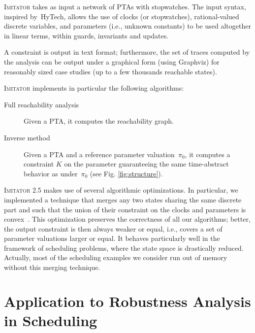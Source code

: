 \documentclass{llncs}
\newcommand{\pio}{\pi_0}
\newcommand{\IM}{\mathit{IM}}
\newcommand{\graphviz}{Graphviz}
\newcommand{\hytech}{{\sc HyTech}}
\newcommand{\imitator}{\textsc{Imitator}}
\begin{document}
\imitator{} takes as input a network of PTAs with stopwatches.
The input syntax, inspired by~\hytech{}, allows the use of clocks (or stopwatches), rational-valued discrete variables, and parameters (i.e., unknown constants) to be used altogether in linear terms, within guards, invariants and updates.

A constraint is output in text format; furthermore, the set of traces computed by the analysis can be output under a graphical form (using \graphviz{}) for reasonably sized case studies (up to a few thousands reachable states).

\imitator{} implements in particular the following algorithms:
\begin{description}
	\item[Full reachability analysis] Given a PTA, it computes the reachability graph.
	\item[Inverse method] Given a PTA and a reference parameter valuation~$\pio$, it computes a constraint $K$ on the parameter guaranteeing the same time-abstract behavior as under~$\pio$ (see Fig. \ref{fig:structure}).
\end{description}

\imitator{} 2.5 makes use of several algorithmic optimizations.
In particular, we implemented a technique that merges any two states sharing the same discrete part %
and such that the union of their constraint on the clocks and parameters is convex~\cite{AFS12}.
This optimization preserves the correctness of all our algorithms; better, the output constraint 
is then always weaker or equal, i.e., covers a set of parameter valuations larger or equal.
It behaves particularly well in the framework of scheduling problems, where the state space is drastically reduced.
Actually, most of the scheduling examples we consider run out of memory without this merging technique.




\section{Application to Robustness Analysis in  Scheduling}
\end{document}
